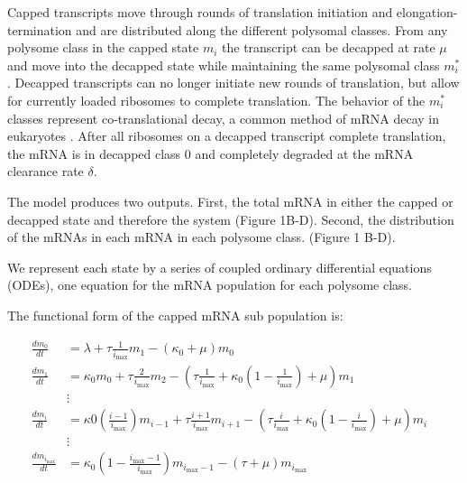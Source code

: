 \documentclass[a4,center,fleqn,nocrop]{NAR}
\newcommand{\imax}{\ensuremath{{i_{\max}}}\xspace}
\begin{document}
Capped transcripts move through rounds of translation initiation and elongation-termination and are distributed along the different polysomal classes. 
From any polysome class in the capped state $m_i$ the transcript can be decapped at rate $\mu$  and move into the decapped state while maintaining the same polysomal class $m_i^*$.
Decapped transcripts can no longer initiate new rounds of translation, but allow for currently loaded ribosomes to complete translation. 
The behavior of the $m_i^*$ classes represent co-translational decay, a common method of mRNA decay in eukaryotes \citep{RN3,RN23,RN4}. 
After all ribosomes on a decapped transcript complete translation, the mRNA is in decapped class 0 and completely degraded at the mRNA clearance rate $\delta$.

The model produces two outputs. 
First, the total mRNA in either the capped or decapped state and therefore the system (Figure 1B-D). 
Second, the distribution of the mRNAs in each mRNA in each polysome class. (Figure 1 B-D).

We represent each state by a series of coupled ordinary differential equations (ODEs), one equation for the mRNA population for each polysome class. 

The functional form of the capped mRNA sub population is:


\begin{strip}
\begin{align} \label{eq:Capped_ODE}
\frac{dm_{0}}{dt} &= \lambda+ \tau \frac{1}{\imax}m_{1}-\left(\kappa_0 + \mu\right)m_{0} \nonumber \\
\frac{dm_{1}}{dt} &= \kappa_0 m_{0}+ \tau \frac{2}{\imax}m_{2}-\left( \tau \frac{1}{\imax}+\kappa_0\left(1-\frac{1}{\imax}\right)+\mu\right) m_{1}\nonumber \\
& \vdots & \nonumber \\
\frac{dm_{i}}{dt} &= \kappa0 \left(\frac{i-1}{\imax}\right) m_{i-1}+ \tau \frac{i+1}{\imax}m_{i+1}-\left( \tau \frac{i}{\imax}+\kappa_0\left(1-\frac{i}{\imax}\right)+\mu\right) m_{i} \nonumber \\
& \vdots & \nonumber \\
\frac{dm_{\imax}}{dt} &= \kappa_0\left(1-\frac{\imax-1}{\imax}\right)m_{\imax-1}-\left( \tau +\mu\right) m_{\imax}
\end{align}
\end{strip}
\end{document}

